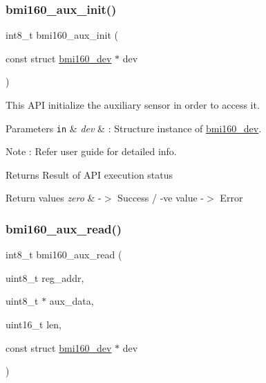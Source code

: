 \subsubsection{\texorpdfstring{bmi160\+\_\+aux\+\_\+init()}{bmi160\_aux\_init()}}
{\footnotesize\ttfamily int8\+\_\+t bmi160\+\_\+aux\+\_\+init (\begin{DoxyParamCaption}\item[{const struct \hyperlink{structbmi160__dev}{bmi160\+\_\+dev} $\ast$}]{dev }\end{DoxyParamCaption})}



This A\+PI initialize the auxiliary sensor in order to access it. 


\begin{DoxyParams}[1]{Parameters}
\mbox{\tt in}  & {\em dev} & \+: Structure instance of \hyperlink{structbmi160__dev}{bmi160\+\_\+dev}. \\
\hline
\end{DoxyParams}
\begin{DoxyNote}{Note}
\+: Refer user guide for detailed info.
\end{DoxyNote}
\begin{DoxyReturn}{Returns}
Result of A\+PI execution status 
\end{DoxyReturn}

\begin{DoxyRetVals}{Return values}
{\em zero} & -\/$>$ Success / -\/ve value -\/$>$ Error \\
\hline
\end{DoxyRetVals}
\mbox{\label{group__bmi160_gab7dba610f920f63a03e84d80be2aa4db}} 
\subsubsection{\texorpdfstring{bmi160\+\_\+aux\+\_\+read()}{bmi160\_aux\_read()}}
{\footnotesize\ttfamily int8\+\_\+t bmi160\+\_\+aux\+\_\+read (\begin{DoxyParamCaption}\item[{uint8\+\_\+t}]{reg\+\_\+addr,  }\item[{uint8\+\_\+t $\ast$}]{aux\+\_\+data,  }\item[{uint16\+\_\+t}]{len,  }\item[{const struct \hyperlink{structbmi160__dev}{bmi160\+\_\+dev} $\ast$}]{dev }\end{DoxyParamCaption})}



